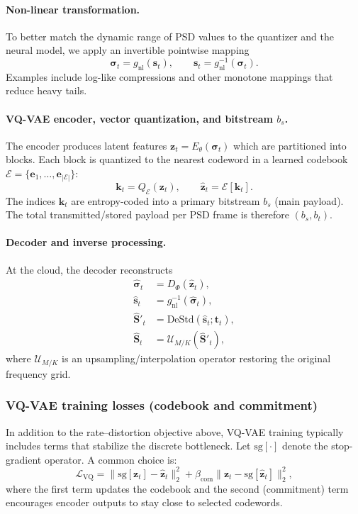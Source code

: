 \documentclass[11pt]{article}
\begin{document}
\paragraph{Non-linear transformation.}
To better match the dynamic range of PSD values to the quantizer and the neural model, we apply an invertible pointwise mapping
\begin{equation}
\bm{\sigma}_t = g_{\mathrm{nl}}(\mathbf{s}_t), \qquad \mathbf{s}_t = g_{\mathrm{nl}}^{-1}(\bm{\sigma}_t).
\end{equation}
Examples include log-like compressions and other monotone mappings that reduce heavy tails.

\paragraph{VQ-VAE encoder, vector quantization, and bitstream $b_s$.}
The encoder produces latent features $\mathbf{z}_t = E_{\theta}(\bm{\sigma}_t)$ which are partitioned into blocks. Each block is quantized to the nearest codeword in a learned codebook $\mathcal{E}=\{\mathbf{e}_1,\ldots,\mathbf{e}_{|\mathcal{E}|}\}$:
\begin{equation}
\mathbf{k}_t = Q_{\mathcal{E}}(\mathbf{z}_t), \qquad \hat{\mathbf{z}}_t=\mathcal{E}[\mathbf{k}_t].
\end{equation}
The indices $\mathbf{k}_t$ are entropy-coded into a primary bitstream $b_s$ (main payload). The total transmitted/stored payload per PSD frame is therefore $(b_s,b_t)$.

\paragraph{Decoder and inverse processing.}
At the cloud, the decoder reconstructs
\begin{align}
\hat{\bm{\sigma}}_t &= D_{\Phi}(\hat{\mathbf{z}}_t),\\
\hat{\mathbf{s}}_t &= g_{\mathrm{nl}}^{-1}(\hat{\bm{\sigma}}_t),\\
\hat{\mathbf{S}}'_t &= \mathrm{DeStd}(\hat{\mathbf{s}}_t;\mathbf{t}_t),\\
\hat{\mathbf{S}}_t &= \mathcal{U}_{M/K}(\hat{\mathbf{S}}'_t),
\end{align}
where $\mathcal{U}_{M/K}$ is an upsampling/interpolation operator restoring the original frequency grid.

\subsubsection{VQ-VAE training losses (codebook and commitment)}
In addition to the rate--distortion objective above, VQ-VAE training typically includes terms that stabilize the discrete bottleneck. Let $\mathrm{sg}[\cdot]$ denote the stop-gradient operator. A common choice is:
\begin{equation}
\mathcal{L}_{\mathrm{VQ}} =
\big\|\mathrm{sg}[\mathbf{z}_t]-\hat{\mathbf{z}}_t\big\|_2^2
+ \beta_{\mathrm{com}}\big\|\mathbf{z}_t-\mathrm{sg}[\hat{\mathbf{z}}_t]\big\|_2^2,
\end{equation}
where the first term updates the codebook and the second (commitment) term encourages encoder outputs to stay close to selected codewords.
\end{document}

